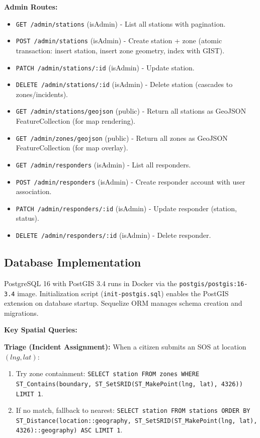 \textbf{Admin Routes:}
\begin{itemize}
  \item \texttt{GET /admin/stations} (isAdmin) - List all stations with pagination.
  \item \texttt{POST /admin/stations} (isAdmin) - Create station + zone (atomic transaction: insert station, insert zone geometry, index with GIST).
  \item \texttt{PATCH /admin/stations/:id} (isAdmin) - Update station.
  \item \texttt{DELETE /admin/stations/:id} (isAdmin) - Delete station (cascades to zones/incidents).
  \item \texttt{GET /admin/stations/geojson} (public) - Return all stations as GeoJSON FeatureCollection (for map rendering).
  \item \texttt{GET /admin/zones/geojson} (public) - Return all zones as GeoJSON FeatureCollection (for map overlay).
  \item \texttt{GET /admin/responders} (isAdmin) - List all responders.
  \item \texttt{POST /admin/responders} (isAdmin) - Create responder account with user association.
  \item \texttt{PATCH /admin/responders/:id} (isAdmin) - Update responder (station, status).
  \item \texttt{DELETE /admin/responders/:id} (isAdmin) - Delete responder.
\end{itemize}

\subsection{Database Implementation}

PostgreSQL 16 with PostGIS 3.4 runs in Docker via the \texttt{postgis/postgis:16-3.4} image. Initialization script (\texttt{init-postgis.sql}) enables the PostGIS extension on database startup. Sequelize ORM manages schema creation and migrations.

\textbf{Key Spatial Queries:}

\textbf{Triage (Incident Assignment):} When a citizen submits an SOS at location $(lng, lat)$:
\begin{enumerate}
  \item Try zone containment: \texttt{SELECT station FROM zones WHERE ST\_Contains(boundary, ST\_SetSRID(ST\_MakePoint(lng, lat), 4326)) LIMIT 1}.
  \item If no match, fallback to nearest: \texttt{SELECT station FROM stations ORDER BY ST\_Distance(location::geography, ST\_SetSRID(ST\_MakePoint(lng, lat), 4326)::geography) ASC LIMIT 1}.
\end{enumerate}

